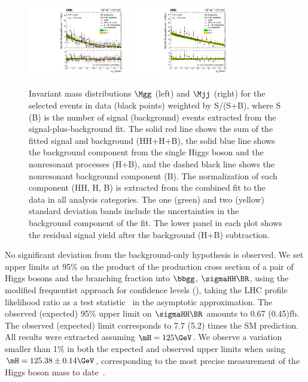 \documentclass[11pt,a4paper,cmspaper,final,collab]{cms-tdr}
\begin{document}
\begin{figure}[htbp]
 \centering
\includegraphics[width=0.40\textwidth]{Figure_009-a.pdf}
\includegraphics[width=0.40\textwidth]{Figure_009-b.pdf}
  \caption{
Invariant mass distributions $\Mgg$ (left) and $\Mjj$ (right) for the selected events in data (black points) weighted by S/(S+B),
        where S (B) is the number of signal (background) events extracted from the signal-plus-background fit.
 The solid red line shows the sum of the fitted signal and background (HH+H+B), the solid blue line shows the background component from the single Higgs boson and the nonresonant processes (H+B), and the dashed black line shows the nonresonant background component (B). The normalization of each component (HH, H, B) is extracted from the combined fit to the data in all analysis categories. The one (green) and two (yellow) standard
  deviation bands include the uncertainties in the background component
  of the fit. The lower panel in each plot shows the residual signal yield after the
 background (H+B) subtraction.} 
 \label{fig:wall_mgg_mjj}
\end{figure}


No significant deviation from the background-only hypothesis is observed. We set upper limits at 95\% \CL on the product of the production cross section of a pair of Higgs bosons and the branching fraction into $\bbgg$, $\sigmaHH \BR$, using the modified frequentist approach for confidence levels (\CLs), taking the LHC profile likelihood ratio 
as a test statistic~\cite{CLS2,CLS1,CLSA,CMS-NOTE-2011-005} in the asymptotic approximation. The observed (expected) 95\% \CL upper limit on $\sigmaHH \BR$
 amounts to 0.67 (0.45)\unit{fb}. The observed (expected) limit corresponds to 7.7 (5.2) times the SM prediction. 
 All results were extracted assuming $\mH = 125 \GeV$. We observe a variation smaller than 1\% in both the expected and observed upper limits when using $\mH = 125.38 \pm 0.14\GeV$, corresponding to the most precise measurement of the
Higgs boson mass to date~\cite{Sirunyan:2020xwk}.
\end{document}
